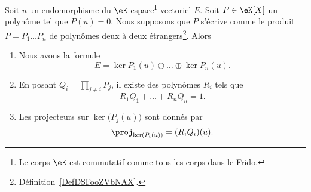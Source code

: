 \begin{theorem}       \label{ThoDecompNoyayzzMWod}
	Soit \( u\) un endomorphisme du \( \eK\)-espace\footnote{Le corps \( \eK\) est commutatif comme tous les corps dans le Frido.} vectoriel \( E\). Soit \( P\in\eK[X]\) un polynôme tel que \( P(u)=0\). Nous supposons que \( P\) s'écrive comme le produit \( P=P_1\ldots P_n\) de polynômes deux à deux étrangers\footnote{Définition~\ref{DefDSFooZVbNAX}.}. Alors
	\begin{enumerate}
		\item
		      Nous avons la formule
		      \begin{equation}
			      E=\ker P_1(u)\oplus\ldots\oplus\ker P_n(u).
		      \end{equation}
		\item
		      En posant \( Q_i=\prod_{j\neq i}P_j\), il existe des polynômes \( R_i\) tels que
		      \begin{equation}
			      R_1Q_1+\ldots +R_nQ_n=1.
		      \end{equation}
		\item       \label{ITEMooMOBPooPVXuXj}
		      Les projecteurs sur \( \ker\big( P_j(u) \big)\) sont donnés par
		      \begin{equation}
			      \proj_{\ker(P_i(u))}=(R_iQ_i)(u).
		      \end{equation}
	\end{enumerate}
\end{theorem}

